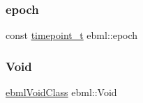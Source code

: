 \subsubsection{\texorpdfstring{epoch}{epoch}}
{\footnotesize\ttfamily const \mbox{\hyperlink{namespaceebml_a7e667ec3fe8b51fb5b8f9690734d8638}{timepoint\+\_\+t}} ebml\+::epoch}

\mbox{\label{namespaceebml_afbfd509d1cb71e416a07253746e886e9}} 
\subsubsection{\texorpdfstring{Void}{Void}}
{\footnotesize\ttfamily \mbox{\hyperlink{classebml_1_1ebmlVoidClass}{ebml\+Void\+Class}} ebml\+::\+Void}

